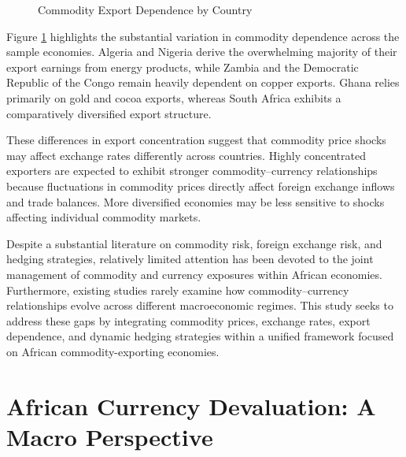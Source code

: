 \documentclass{article}
\begin{document}
\begin{figure}[H]
\centering

\caption{Commodity Export Dependence by Country}
\label{fig:export_dependence}
\end{figure}


Figure \ref{fig:export_dependence} highlights the substantial variation in commodity dependence across the sample economies. Algeria and Nigeria derive the overwhelming majority of their export earnings from energy products, while Zambia and the Democratic Republic of the Congo remain heavily dependent on copper exports. Ghana relies primarily on gold and cocoa exports, whereas South Africa exhibits a comparatively diversified export structure.

These differences in export concentration suggest that commodity price shocks may affect exchange rates differently across countries. Highly concentrated exporters are expected to exhibit stronger commodity--currency relationships because fluctuations in commodity prices directly affect foreign exchange inflows and trade balances. More diversified economies may be less sensitive to shocks affecting individual commodity markets.

Despite a substantial literature on commodity risk, foreign exchange risk, and hedging strategies, relatively limited attention has been devoted to the joint management of commodity and currency exposures within African economies. Furthermore, existing studies rarely examine how commodity--currency relationships evolve across different macroeconomic regimes. This study seeks to address these gaps by integrating commodity prices, exchange rates, export dependence, and dynamic hedging strategies within a unified framework focused on African commodity-exporting economies.

\section{African Currency Devaluation: A Macro Perspective}
\end{document}
